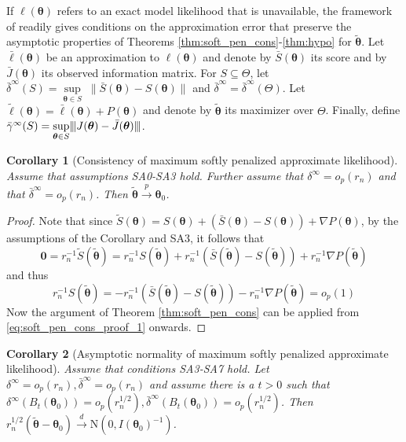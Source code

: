 \documentclass[11pt, a4paper]{article}
\newcommand*{\bb}{\boldsymbol}
\newcommand{\mnorms}[1]{{\vert\kern-0.25ex\vert\kern-0.25ex\vert #1 
		\vert\kern-0.25ex\vert\kern-0.25ex\vert}}
\theoremstyle{example} \newtheorem{example}{Example}[section]
\theoremstyle{theorem} \newtheorem{theorem}{Theorem}[section]
\theoremstyle{theorem }\newtheorem{proposition}{Proposition}[section]
\theoremstyle{theorem }\newtheorem{corollary}{Corollary}[section]
\def\btheta{\bb{\theta}}
\def\b0{\bb{0}}
\def\btnod{\bb{\theta}_0}
\def\bttilde{\tilde{\bb{\theta}}}
\begin{document}
	If $\ell(\btheta)$ refers to an exact model likelihood that is unavailable, the framework of \citet{ogden2017asymptotic} readily gives conditions on the approximation error that preserve the asymptotic properties of Theorems \ref{thm:soft_pen_cons}-\ref{thm:hypo} for $\bttilde$. Let $\bar{\ell}(\btheta)$ be an approximation to $\ell(\btheta)$ and denote by $\bar{S}(\btheta)$ its score and by $\bar{J}(\btheta)$ its observed information matrix. For $S\subseteq \Theta$, let $\bar{\delta}^\infty(S) = \underset{\btheta \in S}{\sup} \; \| \bar{S}(\btheta)-S(\btheta)\|$ and $\bar{\delta}^\infty = \bar{\delta}^\infty(\Theta)$. Let $\tilde{\ell}(\btheta) = \bar{\ell}(\btheta)+P(\btheta)$ and denote by $\bttilde$ its maximizer over $\Theta$. Finally, define $\bar{\gamma}^\infty(S) = \underset{\btheta \in S}{\sup} \mnorms{J(\btheta)-\bar{J}(\btheta)}$.
	\begin{corollary}[Consistency of maximum softly penalized approximate likelihood] \label{cor:cons}
		Assume that assumptions SA0-SA3 hold. Further assume that $\delta^\infty = o_p(r_n)$ and that $\bar{\delta}^\infty = o_p(r_n)$. Then $\bttilde \overset{p}{\to} \btnod$. 
	\end{corollary}
	\begin{proof}
		Note that since $\tilde{S}(\btheta) = S(\btheta) + (\bar{S}(\btheta)-{S}(\btheta)) + \nabla P(\btheta)$, by the assumptions of the Corollary and SA3, it follows that 
		\begin{equation}
			\b0 = r_n^{-1}\tilde{S}(\bttilde) = r_n^{-1}{S}(\bttilde) + r_n^{-1}(\bar{S}(\bttilde)-{S}(\bttilde)) + r_n^{-1}\nabla P(\bttilde)
		\end{equation}
		and thus 
		\begin{equation}
			r_n^{-1}{S}(\bttilde) = - r_n^{-1}(\bar{S}(\bttilde)-{S}(\bttilde)) - r_n^{-1}\nabla P(\bttilde) = o_p(1)
		\end{equation}
		Now the argument of Theorem \ref{thm:soft_pen_cons} can be applied from \eqref{eq:soft_pen_cons_proof_1} onwards.
	\end{proof}
	\begin{corollary}[Asymptotic normality of maximum softly penalized approximate likelihood]\label{cor:asymp_norm}
		Assume that conditions SA3-SA7 hold. Let $\delta^\infty =   o_p(r_n),\bar{\delta}^\infty = o_p(r_n) $ and assume there is a $t>0$ such that $\delta^{\infty}(B_t(\btnod)) = o_p(r_n^{1/2}),\bar{\delta}^{\infty}(B_t(\btnod)) = o_p(r_n^{1/2})$. Then 
		$r_n^{1/2}(\bttilde-\btnod) \overset{d}{\to} \text{N}(0,I(\btnod)^{-1})$. 
	\end{corollary} 
\end{document}
